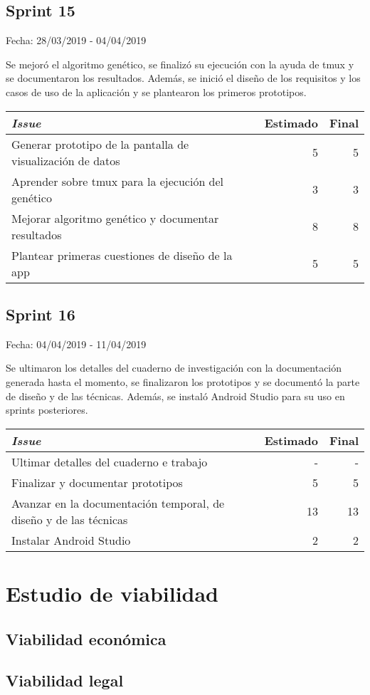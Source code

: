 \subsection{Sprint 15}

Fecha: 28/03/2019 - 04/04/2019

Se mejoró el algoritmo genético, se finalizó su ejecución con la ayuda de tmux y se documentaron los resultados. Además, se inició el diseño de los requisitos y los casos de uso de la aplicación y se plantearon los primeros prototipos. 

\begin{table}[h]
	\begin{tabularx}{\textwidth}{|Xrr|}
		\hline \textbf{\textit{Issue}} & \textbf{Estimado} & \textbf{Final}\\
		\hline Generar prototipo de la pantalla de visualización de datos & 5 & 5 \\
		\hline Aprender sobre tmux para la ejecución del genético & 3 & 3 \\
		\hline Mejorar algoritmo genético y documentar resultados & 8 & 8 \\
		\hline Plantear primeras cuestiones de diseño de la app & 5 & 5 \\
		\hline
	\end{tabularx}
\end{table}

\subsection{Sprint 16}

Fecha: 04/04/2019 - 11/04/2019

Se ultimaron los detalles del cuaderno de investigación con la documentación generada hasta el momento, se finalizaron los prototipos y se documentó la parte de diseño y de las técnicas. Además, se instaló Android Studio para su uso en sprints posteriores. 


\begin{table}[h]
	\begin{tabularx}{\textwidth}{|Xrr|}
		\hline \textbf{\textit{Issue}} & \textbf{Estimado} & \textbf{Final}\\
		\hline Ultimar detalles del cuaderno e trabajo & - & - \\
		\hline Finalizar y documentar prototipos & 5 & 5 \\
		\hline Avanzar en la documentación temporal, de diseño y de las técnicas & 13 & 13 \\
		\hline Instalar Android Studio & 2 & 2 \\
		\hline
	\end{tabularx}
\end{table}

\section{Estudio de viabilidad}

\subsection{Viabilidad económica}

\subsection{Viabilidad legal}


